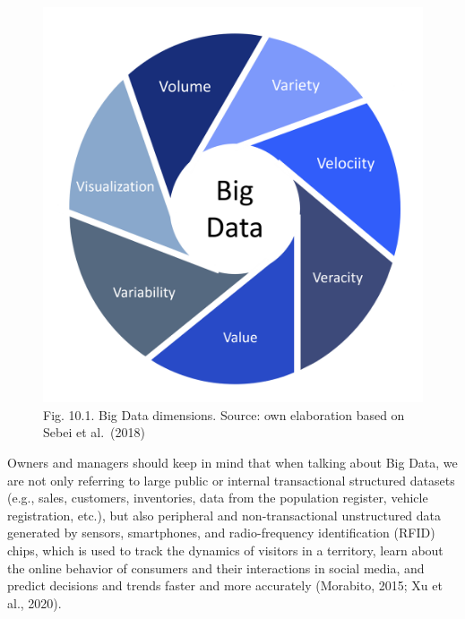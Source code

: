\documentclass[
  letterpaper,
  DIV=11,
  numbers=noendperiod]{scrreprt}
\begin{document}
\begin{figure}

{\centering \includegraphics[width=5.20833in,height=\textheight]{img/fig11.png}

}

\caption{Fig. 10.1. Big Data dimensions. Source: own elaboration based
on Sebei et al.~(2018)}

\end{figure}

Owners and managers should keep in mind that when talking about Big
Data, we are not only referring to large public or internal
transactional structured datasets (e.g., sales, customers, inventories,
data from the population register, vehicle registration, etc.), but also
peripheral and non-transactional unstructured data generated by sensors,
smartphones, and radio-frequency identification (RFID) chips, which is
used to track the dynamics of visitors in a territory, learn about the
online behavior of consumers and their interactions in social media, and
predict decisions and trends faster and more accurately (Morabito, 2015;
Xu et al., 2020).
\end{document}
